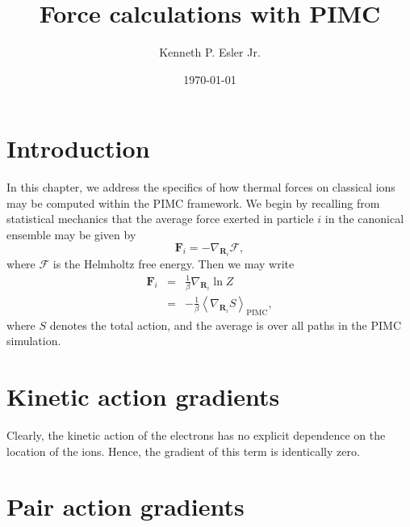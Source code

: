 \documentclass{article}
\title{Force calculations with PIMC}
\author{Kenneth P. Esler Jr.}
\date{\today}
\newcommand{\vR}{\mathbf{R}}
\newcommand{\vF}{\mathbf{F}}
\begin{document}
\maketitle

\section{Introduction}
In this chapter, we address the specifics of how thermal forces on
classical ions may be computed within the PIMC framework.  We begin by
recalling from statistical mechanics that the average force exerted in
particle $i$ in the canonical ensemble may be given by
\begin{equation}
\vF_i = -\nabla_{\vR_i} \mathcal{F},
\end{equation}
where $\mathcal{F}$ is the Helmholtz free energy.  Then we may write 
\begin{eqnarray}
\vF_i & = & \frac{1}{\beta}  \nabla_{\vR_i} \ln Z \\
& = & -\frac{1}{\beta}
\left\langle 
\nabla_{\vR_i} S
\right\rangle_{\text{PIMC}},
\end{eqnarray}
where $S$ denotes the total action, and the average is over all paths
in the PIMC simulation.

\section{Kinetic action gradients}
Clearly, the kinetic action of the electrons has no explicit dependence
on the location of the ions.  Hence, the gradient of this term is
identically zero.

\section{Pair action gradients}
\end{document}
